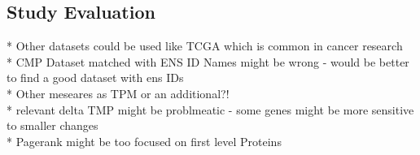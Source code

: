 \subsection{Study Evaluation} \label{subsec:evaluation}

{\color{lightgray}
* Other datasets could be used like TCGA which is common in cancer research \\
* CMP Dataset matched with ENS ID Names might be wrong - would be better to find a good dataset with ens IDs \\
* Other meseares as TPM or an additional?! \\
* relevant delta TMP might be problmeatic - some genes might be more sensitive to smaller changes \\
* Pagerank might be too focused on first level Proteins \\
}

